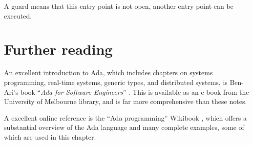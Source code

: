 A guard means that this entry point is not open, another entry point can be executed.

\section{Further reading}

An excellent introduction to Ada, which includes chapters on systems programming, real-time systems, generic types, and distributed systems, is Ben-Ari's book ``\emph{Ada for Software Engineers}'' \cite{ben2009ada}. This is available as an e-book from the University of Melbourne library, and is far more comprehensive than these notes.

A excellent online reference is the ``Ada programming'' Wikibook \cite{ada-wikibook}, which offers a substantial overview of the Ada language and many complete examples, some of which are used in this chapter.



